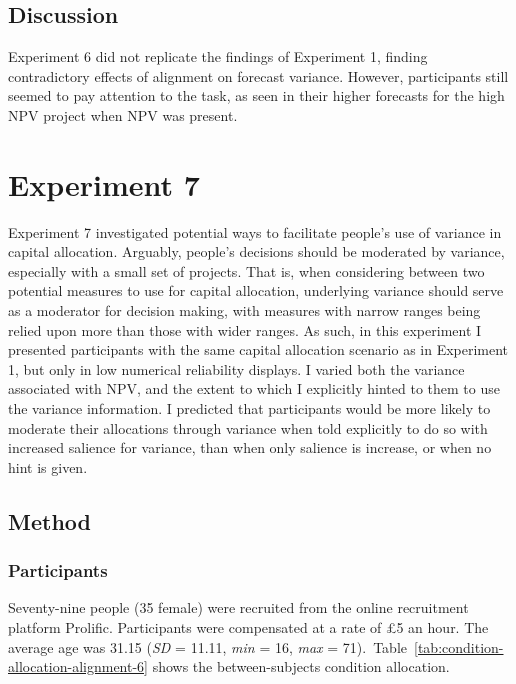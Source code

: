 \documentclass[a4paper, nobind, dvipsnames]{templates/ociamthesis}
\theoremstyle{definition}
\theoremstyle{definition}
\theoremstyle{definition}
\theoremstyle{definition}
\theoremstyle{remark}
\begin{document}
\subsection{Discussion}

Experiment 6 did not replicate the findings of Experiment 1, finding
contradictory effects of alignment on forecast variance. However, participants
still seemed to pay attention to the task, as seen in their higher forecasts for
the high NPV project when NPV was present.

\hypertarget{alignment-6}{%
\section{Experiment 7}\label{alignment-6}}

Experiment 7 investigated potential ways to facilitate people's use of variance
in capital allocation. Arguably, people's decisions should be moderated by
variance, especially with a small set of projects. That is, when considering
between two potential measures to use for capital allocation, underlying
variance should serve as a moderator for decision making, with measures with
narrow ranges being relied upon more than those with wider ranges. As such, in
this experiment I presented participants with the same capital allocation
scenario as in Experiment 1, but only in low numerical reliability displays. I
varied both the variance associated with NPV, and the extent to which I
explicitly hinted to them to use the variance information. I predicted that
participants would be more likely to moderate their allocations through variance
when told explicitly to do so with increased salience for variance, than when
only salience is increase, or when no hint is given.

\subsection{Method}

\subsubsection{Participants}

Seventy-nine people (35 female) were recruited from the online recruitment platform Prolific. Participants were compensated at a rate of £5 an hour. The average age was 31.15 (\emph{SD} = 11.11, \emph{min} = 16, \emph{max} = 71).~Table~\ref{tab:condition-allocation-alignment-6}
shows the between-subjects condition allocation.
\end{document}
